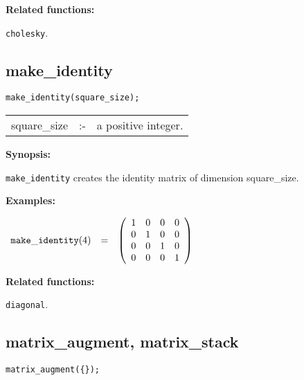 {\bf Related functions:}

\hspace*{0.175in} {\tt cholesky}.


\subsection{make\_identity}


\hspace*{0.175in} {\tt make\_identity(square\_size);}

\hspace*{0.1in} 
\begin{tabular}{l l l}
square\_size &:-& a positive integer.
\end{tabular}

{\bf Synopsis:} %

\hspace*{0.175in} {\tt make\_identity} creates the identity matrix of 
                dimension square\_size.

{\bf Examples:}

\begin{flushleft}  
\hspace*{0.1in}
\begin{math}  
\begin{array}{ccc}
{\tt make\_identity}(4) & = & 
        \left( \begin{array}{cccc} 1 & 0 & 0 & 0 \\ 0 & 1 & 0 & 0 \\ 0 
& 0 & 1 & 0 \\ 0 & 0 & 0 & 1
 \end{array} \right) 
\end{array}
\end{math}  
\end{flushleft}

{\bf Related functions:}

\hspace*{0.175in} {\tt diagonal}.


\subsection{matrix\_augment, matrix\_stack}


\hspace*{0.175in} {\tt matrix\_augment(\{\matlist\});}\lazyfootnote{}

